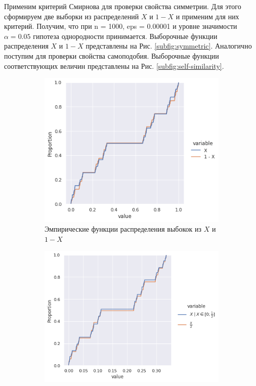 Применим критерий Смирнова для проверки свойства симметрии. Для
 этого сформируем две выборки из распределений $ X $ и $ 1 - X $ и применим для
 них критерий. Получим, что при n = 1000, eps = 0.00001 и уровне значимости
 $ \alpha = 0.05 $ гипотеза однородности принимается. Выборочные функции
 распределения $ X $ и $ 1 - X $ представлены на Рис. \eqref{subfig:symmetric}.
 Аналогично поступим для проверки свойства самоподобия. Выборочные функции
 соответствующих величин представлены на Рис. \eqref{subfig:self-similarity}.

 \begin{figure}
     \centering
     \begin{subfigure}[b]{0.45\textwidth}
         \centering
         \includegraphics[width=\textwidth]{./resources/uniformity_1.png}
         \caption{Эмпирические функции распределения выбокок из $ X $ и $ 1 - X $}
         \label{subfig:symmetric}
     \end{subfigure}
     \hfill
     \begin{subfigure}[b]{0.45\textwidth}
         \centering
         \includegraphics[width=\textwidth]{./resources/uniformity_2.png}

\end{subfigure}
\end{figure}
